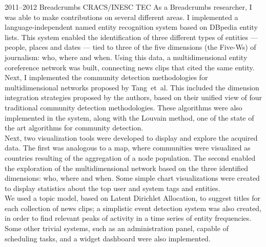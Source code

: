 \documentclass{friggeri-cv}
\begin{document}
\begin{entrylist}
\entry
{2011--2012}
{Breadcrumbs}
{CRACS/INESC TEC}
{As a Breadcrumbs researcher, I was able to make contributions on several different areas. I implemented a language-independent named entity recognition system based on DBpedia entity lists. This system enabled the identification of three different types of entities — people, places and dates — tied to three of the five dimensions (the Five-Ws) of journalism: who, where and when. Using this data, a multidimensional entity coreference network was built, connecting news clips that cited the same entity. Next, I implemented the community detection methodologies for multidimensional networks proposed by Tang~et~al. This included the dimension integration strategies proposed by the authors, based on their unified view of four traditional community detection methodologies. These algorithms were also implemented in the system, along with the Louvain method, one of the state of the art algorithms for community detection.\\

Next, two visualization tools were developed to display and explore the acquired data. The first was analogous to a map, where communities were visualized as countries resulting of the aggregation of a node population. The second enabled the exploration of the multidimensional network based on the three identified dimensions: who, where and when. Some simple chart visualizations were created to display statistics about the top user and system tags and entities.\\

We used a topic model, based on Latent Dirichlet Allocation, to suggest titles for each collection of news clips; a simplistic event detection system was also created, in order to find relevant peaks of activity in a time series of entity frequencies. Some other trivial systems, such as an administration panel, capable of scheduling tasks, and a widget dashboard were also implemented.}
\end{entrylist}
\end{document}
